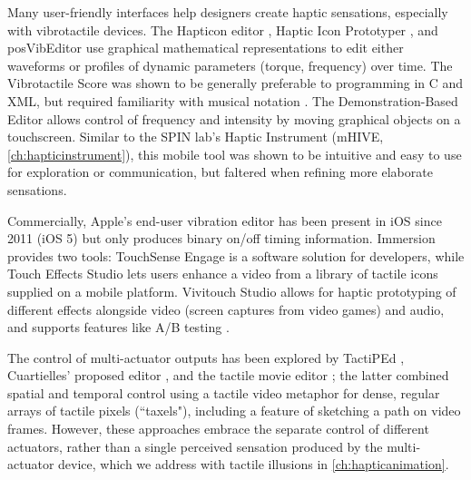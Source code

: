 Many user-friendly interfaces help designers create %
haptic sensations, especially with vibrotactile devices.
The Hapticon editor \cite{Enriquez2003}, Haptic Icon Prototyper \cite{Swindells2006}, and posVibEditor \cite{Ryu2008} use graphical mathematical representations to edit either waveforms or profiles of dynamic parameters (torque, frequency) over time.
The Vibrotactile Score \cite{Lee2009} was shown to be generally preferable to programming in C and XML, but required familiarity with musical notation \cite{Lee2012}. 
The Demonstration-Based Editor \cite{Hong2013} allows control of frequency and intensity by moving graphical objects on a touchscreen.
Similar to the SPIN lab's Haptic Instrument (mHIVE, \autoref{ch:hapticinstrument}), this mobile tool was shown to be intuitive and easy to use for exploration or communication, but faltered when refining more elaborate sensations. %

Commercially, Apple's end-user vibration editor has been present in iOS since 2011 (iOS 5) but only produces binary on/off timing information.
Immersion provides two tools: TouchSense Engage is a software solution for developers, while Touch Effects Studio lets users enhance a video from a  library of tactile icons supplied on a mobile platform.
Vivitouch Studio allows for haptic prototyping of different effects alongside video (screen captures from video games) and audio, and supports features like A/B testing \cite{Swindells2014}.


The control of multi-actuator outputs has been explored by TactiPEd \cite{Paneels2013}, Cuartielles' proposed editor \cite{Cuartielles2012}, and the tactile movie editor \cite{Kim2009}; the latter combined spatial and temporal control using a tactile video metaphor for dense, regular arrays of tactile pixels (``taxels"), including a feature of sketching a path on video frames. 
However, these approaches embrace the separate control of different actuators, rather than a single perceived sensation produced by the multi-actuator device, which we address with tactile illusions in \autoref{ch:hapticanimation}.


